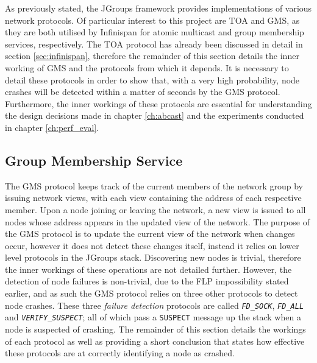 As previously stated, the JGroups framework provides implementations of various network protocols.  Of particular interest to this project are TOA and GMS, as they are both utilised by Infinispan for atomic multicast and group membership services, respectively.  The TOA protocol has already been discussed in detail in section \ref{sec:infinispan}, therefore the remainder of this section details the inner working of GMS and the protocols from which it depends.  It is necessary to detail these protocols in order to show that, with a very high probability, node crashes will be detected within a matter of seconds by the GMS protocol.  Furthermore, the inner workings of these protocols are essential for understanding the design decisions made in chapter \ref{ch:abcast} and the experiments conducted in chapter \ref{ch:perf_eval}.  

\subsection*{Group Membership Service} \label{ssec:jgroups_gms}
The GMS protocol keeps track of the current members of the network group by issuing network views, with each view containing the address of each respective member.  Upon a node joining or leaving the network, a new view is issued to all nodes whose address appears in the updated view of the network.  The purpose of the GMS protocol is to update the current view of the network when changes occur, however it does not detect these changes itself, instead it relies on lower level protocols in the JGroups stack.  Discovering new nodes is trivial, therefore the inner workings of these operations are not detailed further.  However, the detection of node failures is non-trivial, due to the FLP impossibility stated earlier, and as such the GMS protocol relies on three other protocols to detect node crashes.  These three \emph{failure detection} protocols are called \emph{\texttt{FD\_SOCK}}, \emph{\texttt{FD\_ALL}} and \emph{\texttt{VERIFY\_SUSPECT}}; all of which pass a \texttt{SUSPECT} message up the stack when a node is suspected of crashing.  The remainder of this section details the workings of each protocol as well as providing a short conclusion that states how effective these protocols are at correctly identifying a node as crashed.  
    
